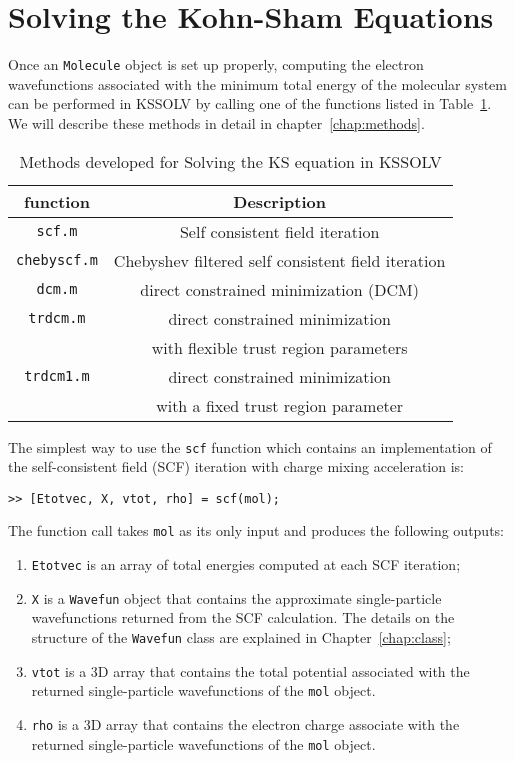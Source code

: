 \documentclass[11pt]{book}
\begin{document}
\section{Solving the Kohn-Sham Equations} \label{sec:solve}
Once an {\tt Molecule} object is set up properly, computing
the electron wavefunctions associated with the minimum total
energy of the molecular system can be performed in KSSOLV by calling 
one of the functions listed in Table~\ref{methodlist}.  We will
describe these methods in detail in chapter~\ref{chap:methods}.
%
\begin{table}[htbp]
\center
\begin{tabular}{|c|c|} \hline
 function       &   Description \\ \hline
{\tt scf.m}     &   Self consistent field iteration \\
{\tt chebyscf.m}&   Chebyshev filtered self consistent field iteration \\
{\tt dcm.m}     &   direct constrained minimization (DCM) \\
{\tt trdcm.m}   &   direct constrained minimization  \\
                &   with flexible trust region parameters \\
{\tt trdcm1.m}  &   direct constrained minimization  \\
                &   with a fixed trust region parameter \\
\hline
\end{tabular}
\caption{Methods developed for Solving the KS equation in KSSOLV}
\label{methodlist}
\end{table}
%

The simplest way to use the {\tt scf} function which contains an
implementation of the self-consistent field (SCF) iteration 
with charge mixing \cite{pulay:80,pulay:82,kerker} acceleration is:
\begin{verbatim}
>> [Etotvec, X, vtot, rho] = scf(mol);
\end{verbatim}
The function call takes {\tt mol} as its only input and produces the
following outputs:
\begin{enumerate}
\item {\tt Etotvec} is an array of total energies computed at each SCF
  iteration;
\item {\tt X} is a {\tt Wavefun} object that contains the approximate
single-particle wavefunctions returned from the SCF
calculation. The details on the structure of the {\tt Wavefun} class
are explained in Chapter~\ref{chap:class};
\item {\tt vtot} is a 3D array that contains the total potential associated
with the returned single-particle wavefunctions of the {\tt mol} object.
\item {\tt rho} is a 3D array that contains the electron charge associate
with the returned single-particle wavefunctions of the {\tt mol} object.
\end{enumerate}  
\end{document}
